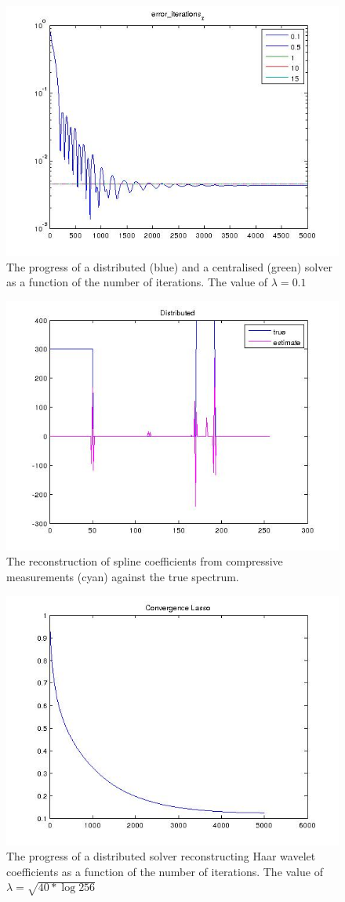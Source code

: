 \documentclass{article}
\begin{document}
\begin{appendices}
\begin{figure}[h]
\centering
\includegraphics[height = 7.3 cm]{mse_iterations.jpg}
\caption{The progress of a distributed (blue) and a centralised (green) solver as a function of the number of iterations. The value of \(\lambda = 0.1\)}
\label{fig:erroriterations}
\end{figure}

\begin{figure}[h]
\centering
\includegraphics[height = 7.3 cm]{recon_spline.jpg}
\caption{The reconstruction of spline coefficients from compressive measurements (cyan) against the true spectrum.}
\label{fig:spline_recon}
\end{figure}

\begin{figure}[h]
\centering
\includegraphics[height = 7.3 cm]{steps.jpg}
\caption{The progress of a distributed solver reconstructing Haar wavelet coefficients as a function of the number of iterations. The value of \( \lambda = \sqrt{40*\log{256}}\)}
\label{fig:steps_wavelets}
\end{figure}


\end{appendices}
\end{document}
